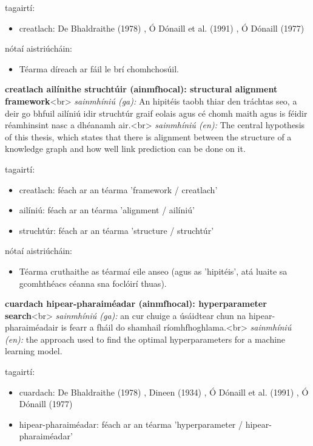 \documentclass{article}
\begin{document}
tagairtí:
\begin{itemize}
	\item creatlach: De Bhaldraithe (1978) \cite{de-bhaldraithe}, Ó Dónaill et al. (1991) \cite{focloir-beag}, Ó Dónaill (1977) \cite{odonaill}
\end{itemize}

nótaí aistriúcháin:
\begin{itemize}
	\item Téarma díreach ar fáil le brí chomhchosúil.
\end{itemize}


\textbf{creatlach ailínithe struchtúir (ainmfhocal): structural alignment framework}<br>
\textit{sainmhíniú (ga):} An hipitéis taobh thiar den tráchtas seo, a deir go bhfuil ailíniú idir struchtúr graif eolais agus cé chomh maith agus is féidir réamhinsint nasc a dhéanamh air.<br>
\textit{sainmhíniú (en):} The central hypothesis of this thesis, which states that there is alignment between the structure of a knowledge graph and how well link prediction can be done on it.

tagairtí:
\begin{itemize}
	\item creatlach: féach ar an téarma 'framework / creatlach'
	\item ailíniú: féach ar an téarma 'alignment / ailíniú'
	\item struchtúr: féach ar an téarma 'structure / struchtúr'
\end{itemize}

nótaí aistriúcháin:
\begin{itemize}
	\item Téarma cruthaithe as téarmaí eile anseo (agus as 'hipitéis', atá luaite sa gcomhthéacs céanna sna foclóirí thuas).
\end{itemize}


\textbf{cuardach hipear-pharaiméadar (ainmfhocal): hyperparameter search}<br>
\textit{sainmhíniú (ga):} an cur chuige a úsáidtear chun na hipear-pharaiméadair is fearr a fháil do shamhail ríomhfhoghlama.<br>
\textit{sainmhíniú (en):} the approach used to find the optimal hyperparameters for a machine learning model.

tagairtí:
\begin{itemize}
	\item cuardach: De Bhaldraithe (1978) \cite{de-bhaldraithe}, Dineen (1934) \cite{dineen}, Ó Dónaill et al. (1991) \cite{focloir-beag}, Ó Dónaill (1977) \cite{odonaill}
	\item hipear-pharaiméadar: féach ar an téarma 'hyperparameter / hipear-pharaiméadar'
\end{itemize}
\end{document}
